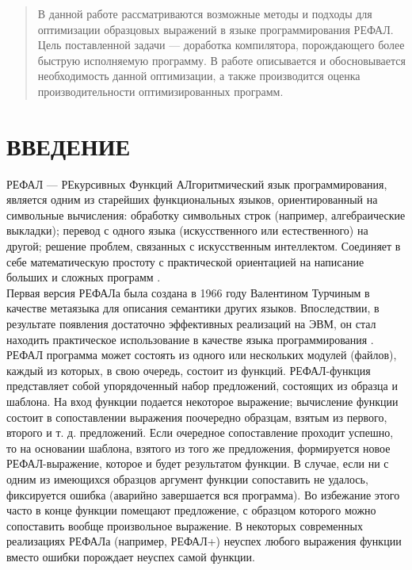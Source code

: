 \documentclass[12pt]{article}
\begin{document}
\renewcommand{\abstractname}{\Huge{Аннотация\\[1.5cm]}}

\begin{abstract}
В данной работе рассматриваются возможные методы и подходы для оптимизации образцовых выражений в языке программирования РЕФАЛ. Цель поставленной задачи --- доработка компилятора, порождающего более быструю исполняемую программу. В работе описывается и обосновывается необходимость данной оптимизации, а также производится оценка производительности оптимизированных программ.
\end{abstract}

\clearpage
\tableofcontents %
\newpage

\part*{\large \centering ВВЕДЕНИЕ}
\hspace{\parindent}РЕФАЛ --- РЕкурсивных Функций АЛгоритмический язык программирования, является одним из старейших функциональных языков, ориентированный на символьные вычисления: обработку символьных строк (например, алгебраические выкладки); перевод с одного языка (искусственного или естественного) на другой; решение проблем, связанных с искусственным интеллектом. Соединяет в себе математическую простоту с практической ориентацией на написание больших и сложных программ \cite{RefalOverview}. \\
\indent Первая версия РЕФАЛа была создана в 1966 году Валентином Турчиным в качестве метаязыка для описания семантики других языков. Впоследствии, в результате появления достаточно эффективных реализаций на ЭВМ, он стал находить практическое использование в качестве языка программирования \cite{RefalHistory}. \\
\indent РЕФАЛ программа может состоять из одного или нескольких модулей (файлов), каждый из которых, в свою очередь, состоит из функций. РЕФАЛ-функция представляет собой упорядоченный набор предложений, состоящих из образца и шаблона. На вход функции подается некоторое выражение; вычисление функции состоит в сопоставлении выражения поочередно образцам, взятым из первого, второго и т. д. предложений. Если очередное сопоставление проходит успешно, то на основании шаблона, взятого из того же предложения, формируется новое РЕФАЛ-выражение, которое и будет результатом функции. В случае, если ни с одним из имеющихся образцов аргумент функции сопоставить не удалось, фиксируется ошибка (аварийно завершается вся программа). Во избежание этого часто в конце функции помещают предложение, с образцом которого можно сопоставить вообще произвольное выражение. В некоторых современных реализациях РЕФАЛа (например, РЕФАЛ+) неуспех любого выражения функции вместо ошибки порождает неуспех самой функции. \\
\end{document}
